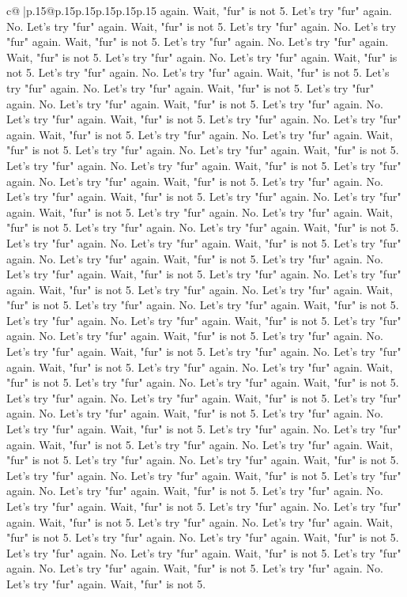 \documentclass{article}
\begin{document}
{\begin{supertabular}{c@{$\;$}|p{.15\linewidth}@{}p{.15\linewidth}p{.15\linewidth}p{.15\linewidth}p{.15\linewidth}p{.15\linewidth}}
{{{again. Wait, "fur" is not 5. Let's try "fur" again. No. Let's try "fur" again. Wait, "fur" is not 5. Let's try "fur" again. No. Let's try "fur" again. Wait, "fur" is not 5. Let's try "fur" again. No. Let's try "fur" again. Wait, "fur" is not 5. Let's try "fur" again. No. Let's try "fur" again. Wait, "fur" is not 5. Let's try "fur" again. No. Let's try "fur" again. Wait, "fur" is not 5. Let's try "fur" again. No. Let's try "fur" again. Wait, "fur" is not 5. Let's try "fur" again. No. Let's try "fur" again. Wait, "fur" is not 5. Let's try "fur" again. No. Let's try "fur" again. Wait, "fur" is not 5. Let's try "fur" again. No. Let's try "fur" again. Wait, "fur" is not 5. Let's try "fur" again. No. Let's try "fur" again. Wait, "fur" is not 5. Let's try "fur" again. No. Let's try "fur" again. Wait, "fur" is not 5. Let's try "fur" again. No. Let's try "fur" again. Wait, "fur" is not 5. Let's try "fur" again. No. Let's try "fur" again. Wait, "fur" is not 5. Let's try "fur" again. No. Let's try "fur" again. Wait, "fur" is not 5. Let's try "fur" again. No. Let's try "fur" again. Wait, "fur" is not 5. Let's try "fur" again. No. Let's try "fur" again. Wait, "fur" is not 5. Let's try "fur" again. No. Let's try "fur" again. Wait, "fur" is not 5. Let's try "fur" again. No. Let's try "fur" again. Wait, "fur" is not 5. Let's try "fur" again. No. Let's try "fur" again. Wait, "fur" is not 5. Let's try "fur" again. No. Let's try "fur" again. Wait, "fur" is not 5. Let's try "fur" again. No. Let's try "fur" again. Wait, "fur" is not 5. Let's try "fur" again. No. Let's try "fur" again. Wait, "fur" is not 5. Let's try "fur" again. No. Let's try "fur" again. Wait, "fur" is not 5. Let's try "fur" again. No. Let's try "fur" again. Wait, "fur" is not 5. Let's try "fur" again. No. Let's try "fur" again. Wait, "fur" is not 5. Let's try "fur" again. No. Let's try "fur" again. Wait, "fur" is not 5. Let's try "fur" again. No. Let's try "fur" again. Wait, "fur" is not 5. Let's try "fur" again. No. Let's try "fur" again. Wait, "fur" is not 5. Let's try "fur" again. No. Let's try "fur" again. Wait, "fur" is not 5. Let's try "fur" again. No. Let's try "fur" again. Wait, "fur" is not 5. Let's try "fur" again. No. Let's try "fur" again. Wait, "fur" is not 5. Let's try "fur" again. No. Let's try "fur" again. Wait, "fur" is not 5. Let's try "fur" again. No. Let's try "fur" again. Wait, "fur" is not 5. Let's try "fur" again. No. Let's try "fur" again. Wait, "fur" is not 5. Let's try "fur" again. No. Let's try "fur" again. Wait, "fur" is not 5. Let's try "fur" again. No. Let's try "fur" again. Wait, "fur" is not 5. Let's try "fur" again. No. Let's try "fur" again. Wait, "fur" is not 5. Let's try "fur" again. No. Let's try "fur" again. Wait, "fur" is not 5. Let's try "fur" again. No. Let's try "fur" again. Wait, "fur" is not 5. Let's try "fur" again. No. Let's try "fur" again. Wait, "fur" is not 5. Let's try "fur" again. No. Let's try "fur" again. Wait, "fur" is not 5. Let's try "fur" again. No. Let's try "fur" again. Wait, "fur" is not 5. Let's try "fur" again. No. Let's try "fur" again. Wait, "fur" is not 5. Let's try "fur" again. No. Let's try "fur" again. Wait, "fur" is not 5. }}}
\end{supertabular}}
\end{document}
